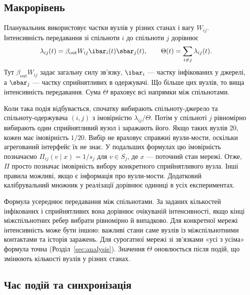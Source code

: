 \subsection{Макрорівень}
\label{sec:macro}

Планувальник використовує частки вузлів у різних станах і вагу $W_{ij}$. Інтенсивність передавання зі спільноти $i$ до спільноти $j$ дорівнює
\begin{equation}
\label{eq:macro_rate}
\lambda_{ij}(t)=\beta_{\mathrm{out}}W_{ij}\ibar_i(t)\sbar_j(t),
\qquad \Theta(t)=\sum_{i\neq j}\lambda_{ij}(t).
\end{equation}
Тут $\beta_{\mathrm{out}}W_{ij}$ задає загальну силу зв'язку, $\ibar_i$ --- частку інфікованих у джерелі, а $\sbar_j$ --- частку сприйнятливих в одержувачі. Що більше цих вузлів, то вища інтенсивність передавання. Сума $\Theta$ враховує всі напрямки між спільнотами.

Коли така подія відбувається, спочатку вибирають спільноту-джерело та спільноту-одержувача $(i,j)$ з імовірністю $\lambda_{ij}/\Theta$. Потім у спільноті $j$ рівномірно вибирають один сприйнятливий вузол і заражають його. Якщо таких вузлів 20, кожен має імовірність $1/20$. Вибір не враховує справжні вузли-мости, оскільки агрегований інтерфейс їх не знає. У подальших формулах цю імовірність позначаємо $\Pi_{ij}(v\mid x)=1/s_j$ для $v\in S_j$, де $x$ --- поточний стан мережі. Отже, $\Pi$ просто позначає імовірність вибору конкретного сприйнятливого вузла. Інші правила можливі, якщо є інформація про вузли-мости. Додатковий калібрувальний множник у реалізації дорівнює одиниці в усіх експериментах.

Формула усереднює передавання між спільнотами. За заданих кількостей інфікованих і сприйнятливих вона дорівнює очікуваній інтенсивності, якщо кінці міжспільнотних ребер вибрати рівномірно й випадково. Для конкретної мережі інтенсивність може бути іншою: важливі стани саме вузлів із міжспільнотними контактами та історія заражень. Для сурогатної мережі зі зв'язками «усі з усіма» формула точна (Розділ~\ref{sec:analysis}). Значення $\Theta$ оновлюється після подій, що змінюють кількості вузлів у різних станах.

\subsection{Час подій та синхронізація}
\label{sec:timing}

